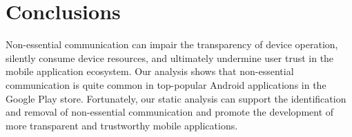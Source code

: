 \section{Conclusions}
\label{sec:conclusions}

Non-essential communication can impair the transparency of device
operation, silently consume device resources, and ultimately undermine
user trust in the mobile application ecosystem. Our analysis shows
that non-essential communication is quite common in 
top-popular Android applications in the Google Play store. Fortunately,
our static analysis can support the identification and removal of
non-essential communication and promote the development of more
transparent and trustworthy mobile applications. 
